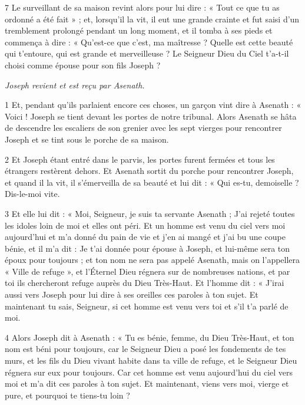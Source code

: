\par 7 Le surveillant de sa maison revint alors pour lui dire : « Tout ce que tu as ordonné a été fait » ; et, lorsqu'il la vit, il eut une grande crainte et fut saisi d'un tremblement prolongé pendant un long moment, et il tomba à ses pieds et commença à dire : « Qu'est-ce que c'est, ma maîtresse ? Quelle est cette beauté qui t'entoure, qui est grande et merveilleuse ? Le Seigneur Dieu du Ciel t'a-t-il choisi comme épouse pour son fils Joseph ?


\par \textit{Joseph revient et est reçu par Asenath.}

\par 1 Et, pendant qu'ils parlaient encore ces choses, un garçon vint dire à Asenath : « Voici ! Joseph se tient devant les portes de notre tribunal. Alors Asenath se hâta de descendre les escaliers de son grenier avec les sept vierges pour rencontrer Joseph et se tint sous le porche de sa maison.

\par 2 Et Joseph étant entré dans le parvis, les portes furent fermées et tous les étrangers restèrent dehors. Et Asenath sortit du porche pour rencontrer Joseph, et quand il la vit, il s'émerveilla de sa beauté et lui dit : « Qui es-tu, demoiselle ? Dis-le-moi vite.

\par 3 Et elle lui dit : « Moi, Seigneur, je suis ta servante Asenath ; J'ai rejeté toutes les idoles loin de moi et elles ont péri. Et un homme est venu du ciel vers moi aujourd'hui et m'a donné du pain de vie et j'en ai mangé et j'ai bu une coupe bénie, et il m'a dit : Je t'ai donnée pour épouse à Joseph, et lui-même sera ton époux pour toujours ; et ton nom ne sera pas appelé Asenath, mais on l'appellera « Ville de refuge », et l'Éternel Dieu régnera sur de nombreuses nations, et par toi ils chercheront refuge auprès du Dieu Très-Haut. Et l’homme dit : « J’irai aussi vers Joseph pour lui dire à ses oreilles ces paroles à ton sujet. Et maintenant tu sais, Seigneur, si cet homme est venu vers toi et s'il t'a parlé de moi.

\par 4 Alors Joseph dit à Asenath : « Tu es bénie, femme, du Dieu Très-Haut, et ton nom est béni pour toujours, car le Seigneur Dieu a posé les fondements de tes murs, et les fils du Dieu vivant habite dans ta ville de refuge, et le Seigneur Dieu régnera sur eux pour toujours. Car cet homme est venu aujourd’hui du ciel vers moi et m’a dit ces paroles à ton sujet. Et maintenant, viens vers moi, vierge et pure, et pourquoi te tiens-tu loin ?

